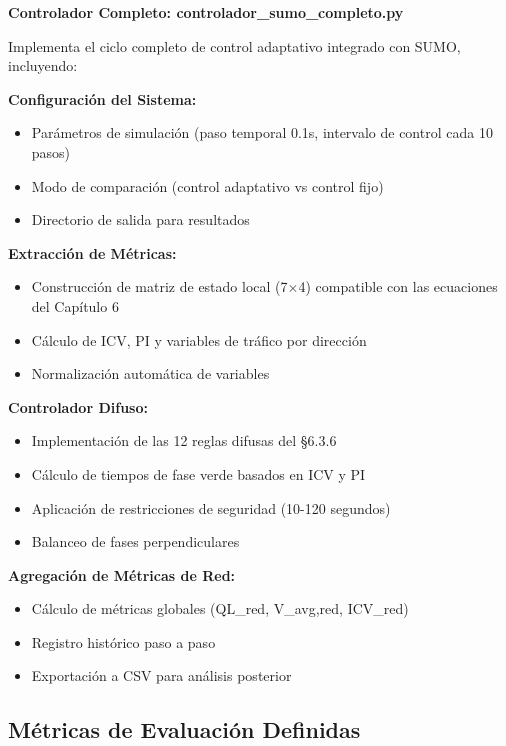\documentclass[12pt,a4paper,oneside]{report}
\begin{document}
\textbf{Controlador Completo: controlador\_sumo\_completo.py}

Implementa el ciclo completo de control adaptativo integrado con SUMO, incluyendo:

\textbf{Configuración del Sistema:}

\begin{itemize}
\item
  Parámetros de simulación (paso temporal 0.1s, intervalo de control cada 10 pasos)
\item
  Modo de comparación (control adaptativo vs control fijo)
\item
  Directorio de salida para resultados
\end{itemize}

\textbf{Extracción de Métricas:}

\begin{itemize}
\item
  Construcción de matriz de estado local (7\ensuremath{\times}4) compatible con las ecuaciones del Capítulo 6
\item
  Cálculo de ICV, PI y variables de tráfico por dirección
\item
  Normalización automática de variables
\end{itemize}

\textbf{Controlador Difuso:}

\begin{itemize}
\item
  Implementación de las 12 reglas difusas del §6.3.6
\item
  Cálculo de tiempos de fase verde basados en ICV y PI
\item
  Aplicación de restricciones de seguridad (10-120 segundos)
\item
  Balanceo de fases perpendiculares
\end{itemize}

\textbf{Agregación de Métricas de Red:}

\begin{itemize}
\item
  Cálculo de métricas globales (QL\_red, V\_avg,red, ICV\_red)
\item
  Registro histórico paso a paso
\item
  Exportación a CSV para análisis posterior
\end{itemize}

\subsection{Métricas de Evaluación Definidas}\label{muxe9tricas-de-evaluaciuxf3n-definidas}
\end{document}
